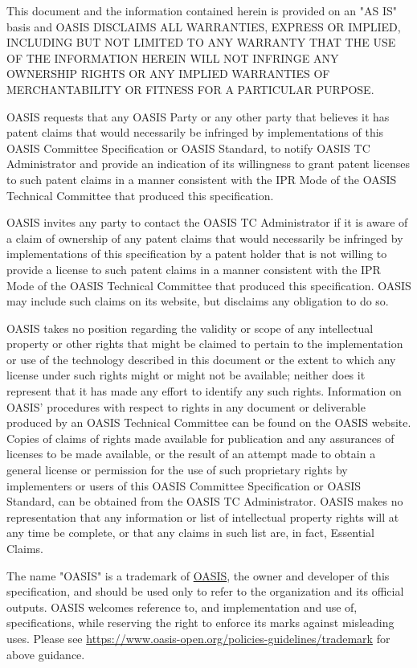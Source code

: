 \begin{titlepage}
This document and the information contained herein is provided on an
"AS IS" basis and OASIS DISCLAIMS ALL WARRANTIES, EXPRESS OR IMPLIED,
INCLUDING BUT NOT LIMITED TO ANY WARRANTY THAT THE USE OF THE
INFORMATION HEREIN WILL NOT INFRINGE ANY OWNERSHIP RIGHTS OR ANY
IMPLIED WARRANTIES OF MERCHANTABILITY OR FITNESS FOR A PARTICULAR
PURPOSE.

OASIS requests that any OASIS Party or any other party that believes
it has patent claims that would necessarily be infringed by
implementations of this OASIS Committee Specification or OASIS
Standard, to notify OASIS TC Administrator and provide an indication
of its willingness to grant patent licenses to such patent claims in a
manner consistent with the IPR Mode of the OASIS Technical Committee
that produced this specification.

OASIS invites any party to contact the OASIS TC Administrator if it is
aware of a claim of ownership of any patent claims that would
necessarily be infringed by implementations of this specification by a
patent holder that is not willing to provide a license to such patent
claims in a manner consistent with the IPR Mode of the OASIS Technical
Committee that produced this specification. OASIS may include such
claims on its website, but disclaims any obligation to do so.

OASIS takes no position regarding the validity or scope of any
intellectual property or other rights that might be claimed to pertain
to the implementation or use of the technology described in this
document or the extent to which any license under such rights might or
might not be available; neither does it represent that it has made any
effort to identify any such rights. Information on OASIS' procedures
with respect to rights in any document or deliverable produced by an
OASIS Technical Committee can be found on the OASIS website. Copies of
claims of rights made available for publication and any assurances of
licenses to be made available, or the result of an attempt made to
obtain a general license or permission for the use of such proprietary
rights by implementers or users of this OASIS Committee Specification
or OASIS Standard, can be obtained from the OASIS TC Administrator.
OASIS makes no representation that any information or list of
intellectual property rights will at any time be complete, or that any
claims in such list are, in fact, Essential Claims.

The name "OASIS" is a trademark of \href{https://www.oasis-open.org/}{OASIS}, the owner and developer of
this specification, and should be used only to refer to the
organization and its official outputs. OASIS welcomes reference to,
and implementation and use of, specifications, while reserving the
right to enforce its marks against misleading uses. Please see
\url{https://www.oasis-open.org/policies-guidelines/trademark} for above guidance.
\\\\

\end{titlepage}
